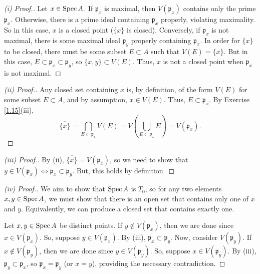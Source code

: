 \begin{proof}[(i) Proof.]
Let $x \in \operatorname{Spec} A$. If $\mathfrak{p}_x$ is maximal, then $V(\mathfrak{p}_x)$ contains only the prime $\mathfrak{p}_x$. Otherwise, there is a
prime ideal containing $\mathfrak{p}_x$ properly, violating maximality. So in this case, $x$ is a closed point ($\{x\}$ is closed). Conversely,
if $\mathfrak{p}_x$ is not maximal, there is some maximal ideal $\mathfrak{p}_y$ properly containing $\mathfrak{p}_x$. In order for $\{x\}$ to be
closed, there must be some subset $E \subset A$ such that $V(E) = \{x\}$. But in this case, $E \subset \mathfrak{p}_x \subset \mathfrak{p}_y$, so
$\{x,y\}\subset V(E)$. Thus, $x$ is not a closed point when $\mathfrak{p}_x$ is not maximal.
\end{proof}

\begin{proof}[(ii) Proof.]
Any closed set containing $x$ is, by definition, of the form $V(E)$ for some subset $E \subset A$, and by assumption, $x \in V(E)$. Thus, 
$E \subset \mathfrak{p}_x$. By Exercise \ref{1.15}(iii),
$$\overline{\{x\}} = \bigcap_{E \subset \mathfrak{p}_x}V(E) = V\left(\bigcup_{E \subset \mathfrak{p}_x}E\right) = V(\mathfrak{p}_x).$$
\end{proof}

\begin{proof}[(iii) Proof.]
By (ii), $\overline{\{x\}} = V(\mathfrak{p}_x)$, so we need to show that $y \in V(\mathfrak{p}_x) \iff \mathfrak{p}_x \subset \mathfrak{p}_y$. 
But, this holds by definition.
\end{proof}

\begin{proof}[(iv) Proof.]
We aim to show that $\operatorname{Spec} A$ is $T_0$, so for any two elements $x,y \in \operatorname{Spec} A$, we must show that there is an open set that contains only one of
$x$ and $y$. Equivalently, we can produce a closed set that contains exactly one.

Let $x,y \in \operatorname{Spec} A$ be distinct points. If $y \not\in V(\mathfrak{p}_x)$, then we are done since $x \in V(\mathfrak{p}_x)$. So, suppose $y \in V(\mathfrak{p}_x)$. 
By (iii), $\mathfrak{p}_x \subset \mathfrak{p}_y$. Now, consider $V(\mathfrak{p}_y)$. If $x \not\in V(\mathfrak{p}_y)$, then we are done since
$y \in V(\mathfrak{p}_y)$. So, suppose $x \in V(\mathfrak{p}_y)$. By (iii), $\mathfrak{p}_y \subset \mathfrak{p}_x$, so $\mathfrak{p}_x = \mathfrak{p}_y$
(or $x=y$), providing the necessary contradiction.
\end{proof}

